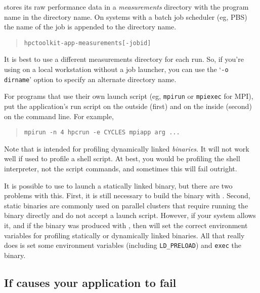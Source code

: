 \hpcrun{} stores its raw performance data in a {\it measurements}
directory with the program name in the directory name.  On systems
with a batch job scheduler (eg, PBS) the name of the job is appended
to the directory name.

\begin{quote}
\begin{verbatim}
hpctoolkit-app-measurements[-jobid]
\end{verbatim}
\end{quote}

It is best to use a different measurements directory for each run.
So, if you're using \hpcrun{} on a local workstation without a job
launcher, you can use the `\verb|-o dirname|' option to specify an
alternate directory name.

For programs that use their own launch script (eg, \verb|mpirun| or
\verb|mpiexec| for MPI), put the application's run script on the
outside (first) and \hpcrun{} on the inside (second) on the command
line.  For example,

\begin{quote}
\begin{verbatim}
mpirun -n 4 hpcrun -e CYCLES mpiapp arg ...
\end{verbatim}
\end{quote}

Note that \hpcrun{} is intended for profiling dynamically linked {\it
binaries}.  It will not work well if used to profile a shell script.
At best, you would be profiling the shell interpreter, not the script
commands, and sometimes this will fail outright.

It is possible to use \hpcrun{} to launch a statically linked binary,
but there are two problems with this.  First, it is still necessary to
build the binary with \hpclink{}.  Second, static binaries are
commonly used on parallel clusters that require running the binary
directly and do not accept a launch script.  However, if your system
allows it, and if the binary was produced with \hpclink, then
\hpcrun{} will set the correct environment variables for profiling
statically or dynamically linked binaries.  All that \hpcrun{} really
does is set some environment variables (including \verb|LD_PRELOAD|)
and \verb|exec| the binary.

\subsection{If  \hpcrun{} causes your application to fail}

